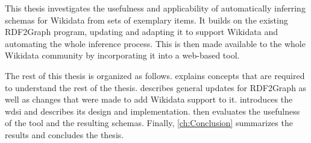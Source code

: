 This thesis investigates the usefulness and applicability
of automatically inferring \glspl{schema} for \gls{Wikidata} from sets of exemplary \glspl{item}.
It builds on the existing \gls{RDF2Graph} \cite{vanDam2015} program,
updating and adapting it to support \gls{Wikidata}
and automating the whole inference process.
This is then made available to the whole \gls{Wikidata} community
by incorporating it into a web-based tool.

The rest of this thesis
is organized as follows.
 explains concepts that are required
to understand the rest of the thesis.
 describes general updates for \gls{RDF2Graph}
as well as changes that were made to add \gls{Wikidata} support to it.
 introduces the \gls{wdsi}
and describes its design and implementation.
 then evaluates the usefulness of the tool and the resulting \glspl{schema}.
Finally, \cref{ch:Conclusion} summarizes the results and concludes the thesis.
